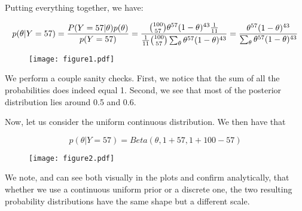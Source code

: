 \documentclass[12pt]{article}
\begin{document}
Putting everything together, we have:

$$
p(\theta | Y=57)= \frac{P(Y=57 | \theta)p(\theta)} {p(Y=57)} \\
=\frac{{100 \choose 57} \theta^{57}(1-\theta)^{43} \frac{1}{11}}{\frac{1}{11}{100 \choose 57}   \sum_{\theta} \theta^{57}(1-\theta)^{43}} \\
=\frac{\theta^{57}(1-\theta)^{43}}{\sum_{\theta} \theta^{57}(1-\theta)^{43}}
$$

\begin{figure}
    \centering
    \texttt{[image: figure1.pdf]}
\end{figure}

We perform a couple sanity checks. First, we notice that the sum of all the probabilities does indeed equal 1. Second, we see that most of the posterior distribution lies around 0.5 and 0.6.

Now, let us consider the uniform continuous distribution. We then have that

$$
p(\theta | Y=57)=Beta(\theta,1+57,1+100-57)
$$

\begin{figure}
    \centering
    \texttt{[image: figure2.pdf]}
\end{figure}

We note, and can see both visually in the plots and confirm analytically, that whether we use a continuous uniform prior or a discrete one, the two resulting probability distributions have the same shape but a different scale.



\end{document}
